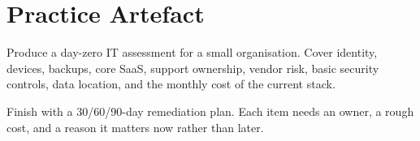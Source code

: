 \section{Practice Artefact}

Produce a day-zero IT assessment for a small organisation. Cover identity, devices, backups, core SaaS, support ownership, vendor risk, basic security controls, data location, and the monthly cost of the current stack.


Finish with a 30/60/90-day remediation plan. Each item needs an owner, a rough cost, and a reason it matters now rather than later.
